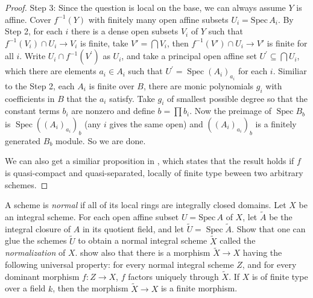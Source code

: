 \begin{proof}
	Step 3: Since the question is local on the base,  we can always assume $Y$ is affine.  Cover $f^{-1}(Y)$ with finitely many open affine subsets $U_{i}= \mathrm{Spec}\,A_{i} $. By Step 2, for each $i$ there is a dense open subsets $V_{i}$ of $Y$ such that $f^{-1}(V_{i})\cap U_{i}\rightarrow V_{i}$  is finite,  take $V'=\bigcap V_{i}$,  then $f^{-1}(V')\cap U_{i}\rightarrow V'$ is finite for all $i$.  Write $U_{i} \cap f^{-1} (V^{\prime})$ as $U_{i}$,  and  take a principal open affine set $U^{\prime} \subseteq \bigcap U_{i}$, which there are elements $a_{i} \in A_{i}$ such that $U^{\prime}=\operatorname{Spec}\left(A_{i}\right)_{a_{i}}$ for each $i$. Similiar to the Step 2, each $A_{i}$ is finite over $B$, there are monic polynomials $g_{i}$ with coefficients in $B$ that the $a_{i}$ satisfy. Take $g_{i}$ of smallest possible degree so that the constant terms $b_{i}$ are nonzero and define $b=\prod b_{i} .$ Now the preimage of $\operatorname{Spec} B_{b}$ is $\operatorname{Spec}\left(\left(A_{i}\right)_{a_{i}}\right)_{b}$ (any $i$ gives the same open) and $\left(\left(A_{i}\right)_{a_{i}}\right)_{b}$ is a finitely generated $B_{b}$ module. So we are done.  
	
	We can also get a similiar proposition in \cite[\href{https://stacks.math.columbia.edu/tag/02NW}{Tag 02NW}]{stacks-project},  which states that the result holds if $f$  is quasi-compact and quasi-separated,  locally of finite type beween two arbitrary schemes.
\end{proof}

\begin{exe}[Normalization]
	\label{2.3.8}
	A scheme is \emph{normal} if all of its local rings are integrally closed domains. Let $X$ be an integral scheme.  For each open affine subset $U= \mathrm{Spec}\,A$ of $X$, let $\widetilde{A}$ be the integral closure of $A$ in its quotient field, and let $\widetilde{U}=\operatorname{Spec} \widetilde{A} $. Show that one can glue the schemes $\widetilde{U}$ to obtain a normal integral scheme $\widetilde{X}$ called the \emph{normalization} of $X$. show also that there is a morphism $\widetilde{X} \rightarrow X$ having the following universal property: for every normal integral scheme $Z$, and for every dominant morphism $f: Z \rightarrow X$, $f$ factors uniquely through $\widetilde{X} .$ If $X$ is of finite type over a field $k$, then the morphism $\widetilde{X} \rightarrow X$ is a finite morphism.
\end{exe}

